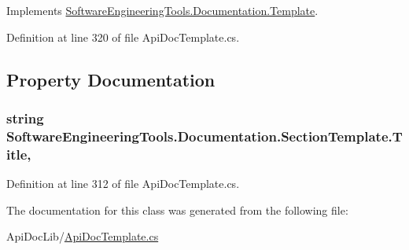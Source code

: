 Implements \hyperlink{class_software_engineering_tools_1_1_documentation_1_1_template_ab13b45a10b7eb65a0b6c15dbc1318664}{Software\+Engineering\+Tools.\+Documentation.\+Template}.



Definition at line 320 of file Api\+Doc\+Template.\+cs.



\subsection{Property Documentation}
\hypertarget{class_software_engineering_tools_1_1_documentation_1_1_section_template_a59c26c917511184723c57a18b415093e}{
\subsubsection[{Title}]{\setlength{\rightskip}{0pt plus 5cm}string Software\+Engineering\+Tools.\+Documentation.\+Section\+Template.\+Title\hspace{0.3cm}{\ttfamily [get]}, {\ttfamily [set]}}}\label{class_software_engineering_tools_1_1_documentation_1_1_section_template_a59c26c917511184723c57a18b415093e}


Definition at line 312 of file Api\+Doc\+Template.\+cs.



The documentation for this class was generated from the following file\+:\begin{DoxyCompactItemize}
\item 
Api\+Doc\+Lib/\hyperlink{_api_doc_template_8cs}{Api\+Doc\+Template.\+cs}\end{DoxyCompactItemize}
